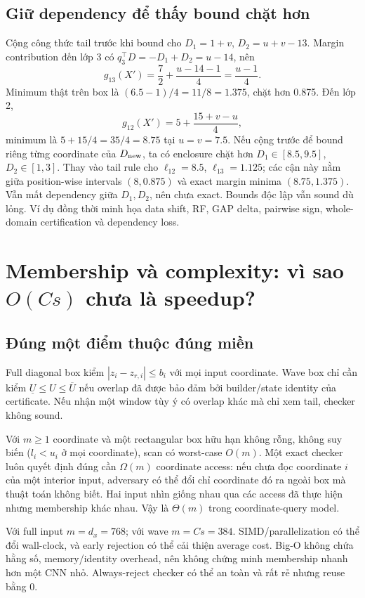 \documentclass[11pt,a4paper]{article}
\theoremstyle{definition}
\begin{document}
\subsection{Giữ dependency để thấy bound chặt hơn}
Cộng công thức tail trước khi bound cho
$D_1=1+v$, $D_2=u+v-13$. Margin contribution đến lớp 3 có
$q_3^\top D=-D_1+D_2=u-14$, nên
\begin{equation}
g_{13}(X')=\frac72+\frac{u-14-1}{4}=\frac{u-1}{4}.
\end{equation}
Minimum thật trên box là $(6.5-1)/4=11/8=1.375$, chặt hơn 0.875.
Đến lớp 2,
\begin{equation}
g_{12}(X')=5+\frac{15+v-u}{4},
\end{equation}
minimum là $5+15/4=35/4=8.75$ tại $u=v=7.5$.
Nếu cộng trước để bound riêng từng coordinate của $D_{\rm new}$,
ta có enclosure chặt hơn $D_1\in[8.5,9.5]$, $D_2\in[1,3]$.
Thay vào tail rule cho $\ell_{12}=8.5$, $\ell_{13}=1.125$; các cận này
nằm giữa position-wise intervals $(8,0.875)$ và exact margin minima
$(8.75,1.375)$. Vẫn mất dependency giữa $D_1,D_2$, nên chưa exact.
Bounds độc lập vẫn sound dù lỏng. Ví dụ đồng thời minh họa data shift,
RF, GAP delta, pairwise sign, whole-domain certification và dependency loss.

\section{Membership và complexity: vì sao \texorpdfstring{$O(Cs)$}{O(Cs)} chưa là speedup?}
\subsection{Đúng một điểm thuộc đúng miền}
Full diagonal box kiểm $|z_i-z_{r,i}|\le b_i$ với mọi input coordinate.
Wave box chỉ cần kiểm $\underline U\le U\le\overline U$ nếu overlap đã
được bảo đảm bởi builder/state identity của certificate. Nếu nhận một
window tùy ý có overlap khác mà chỉ xem tail, checker không sound.

Với $m\ge1$ coordinate và một rectangular box hữu hạn không rỗng, không
suy biến ($l_i<u_i$ ở mọi coordinate), scan có worst-case $O(m)$.
Một exact checker luôn quyết định đúng cần $\Omega(m)$ coordinate access:
nếu chưa đọc coordinate $i$ của một interior input, adversary có thể đổi
chỉ coordinate đó ra ngoài box mà thuật toán không biết. Hai input nhìn
giống nhau qua các access đã thực hiện nhưng membership khác nhau.
Vậy là $\Theta(m)$ trong coordinate-query model.

Với full input $m=d_x=768$; với wave $m=Cs=384$. SIMD/parallelization có
thể đổi wall-clock, và early rejection có thể cải thiện average cost.
Big-O không chứa hằng số, memory/identity overhead, nên không chứng minh
membership nhanh hơn một CNN nhỏ. Always-reject checker có thể an toàn
và rất rẻ nhưng reuse bằng 0.
\end{document}
